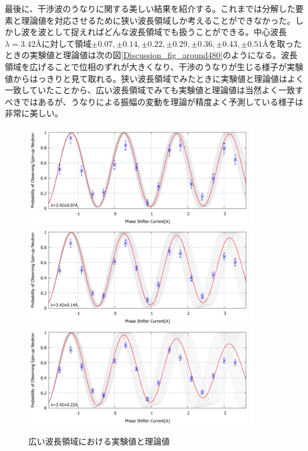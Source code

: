 最後に、干渉波のうなりに関する美しい結果を紹介する。これまでは分解した要素と理論値を対応させるために狭い波長領域しか考えることができなかった。しかし波を波として捉えればどんな波長領域でも扱うことができる。中心波長$\lambda=3.42$\AA に対して領域$\pm 0.07,\pm0.14,\pm0.22,\pm0.29,\pm0.36,\pm0.43,\pm0.51$\AA を取ったときの実験値と理論値は次の図\ref{Discussion_fig_around480}のようになる。波長領域を広げることで位相のずれが大きくなり、干渉のうなりが生じる様子が実験値からはっきりと見て取れる。狭い波長領域でみたときに実験値と理論値はよく一致していたことから、広い波長領域でみても実験値と理論値は当然よく一致すべきではあるが、うなりによる振幅の変動を理論が精度よく予測している様子は非常に美しい。
\vspace{1cm}
\begin{figure}[H]
\centering
\includegraphics[width=10cm]{discussion/SEA/IT_480_10.pdf}
\includegraphics[width=10cm]{discussion/SEA/IT_480_20.pdf}
\includegraphics[width=10cm]{discussion/SEA/IT_480_30.pdf}
\caption{広い波長領域における実験値と理論値}
\end{figure}
